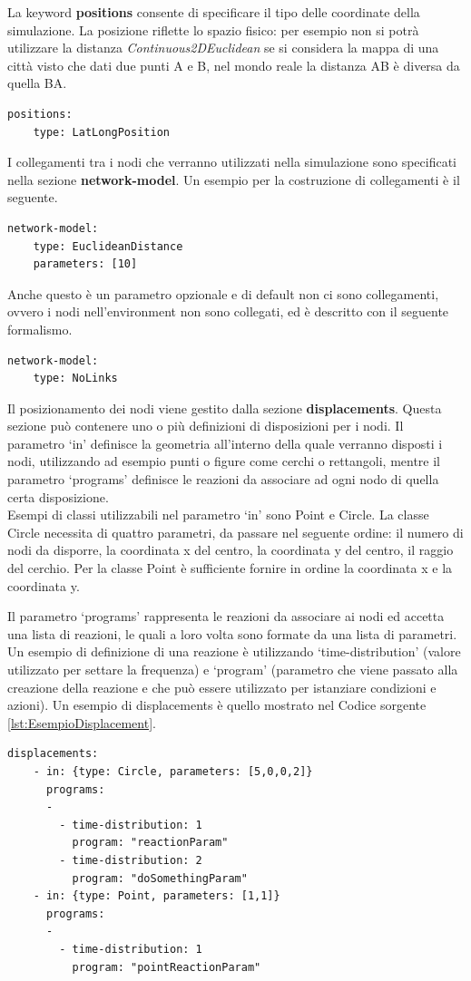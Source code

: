 La keyword \textbf{positions} consente di specificare il tipo delle coordinate della simulazione. La posizione riflette lo spazio fisico: per esempio non si potrà utilizzare la distanza \textit{Continuous2DEuclidean} se si considera la mappa di una città visto che dati due punti A e B, nel mondo reale la distanza AB è diversa da quella BA.
\medskip
\begin{lstlisting}[firstnumber=last,caption={Posizioni}]
  positions:
    type: LatLongPosition
\end{lstlisting}

I collegamenti tra i nodi che verranno utilizzati nella simulazione sono specificati nella sezione \textbf{network-model}. Un esempio per la costruzione di collegamenti è il seguente.
\medskip
\begin{lstlisting}[firstnumber=last,caption={Funzione linking-rule}]
  network-model:
    type: EuclideanDistance
    parameters: [10]
\end{lstlisting}
Anche questo è un parametro opzionale e di default non ci sono collegamenti, ovvero i nodi nell'environment non sono collegati, ed è descritto con il seguente formalismo.
\medskip
\begin{lstlisting}[firstnumber=last,caption={Default linking-rule}]
  network-model:
    type: NoLinks
\end{lstlisting}

Il posizionamento dei nodi viene gestito dalla sezione \textbf{displacements}. Questa sezione può contenere uno o più definizioni di disposizioni per i nodi.
Il parametro `in' definisce la geometria all'interno della quale verranno disposti i nodi, utilizzando ad esempio punti o figure come cerchi o rettangoli, mentre il parametro `programs' definisce le reazioni da associare ad ogni nodo di quella certa disposizione.
\\
Esempi di classi utilizzabili nel parametro `in' sono Point e Circle.
La classe Circle necessita di quattro parametri, da passare nel seguente ordine: il numero di nodi da disporre, la coordinata x del centro, la coordinata y del centro, il raggio del cerchio. Per la classe Point è sufficiente fornire in ordine la coordinata x e la coordinata y.

Il parametro `programs' rappresenta le reazioni da associare ai nodi ed accetta una lista di reazioni, le quali a loro volta sono formate da una lista di parametri. Un esempio di definizione di una reazione è utilizzando `time-distribution' (valore utilizzato per settare la frequenza) e `program' (parametro che viene passato alla creazione della reazione e che può essere utilizzato per istanziare condizioni e azioni).
Un esempio di displacements è quello mostrato nel Codice sorgente \ref{lst:EsempioDisplacement}.
\medskip
\begin{lstlisting}[firstnumber=last,label={lst:EsempioDisplacement},caption={Disposizione nodi e reazioni associate}]
  displacements:
    - in: {type: Circle, parameters: [5,0,0,2]}
      programs:
      -
        - time-distribution: 1
          program: "reactionParam"
        - time-distribution: 2
          program: "doSomethingParam"
    - in: {type: Point, parameters: [1,1]}
      programs:
      -
        - time-distribution: 1
          program: "pointReactionParam"
\end{lstlisting}

